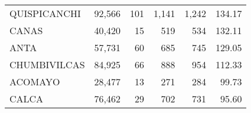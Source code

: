 \begin{tabular}{lrrrrr}
	\cellcolor[HTML]{FFFFC7}QUISPICANCHI                                              & 92,566                                                         & 101                                                      & 1,141                                                    & 1,242                                                               & 134.17                                                                       \\
	\cellcolor[HTML]{FFFFC7}CANAS                                                     & 40,420                                                         & 15                                                       & 519                                                      & 534                                                                 & 132.11                                                                       \\
	\cellcolor[HTML]{FFFFC7}ANTA                                                      & 57,731                                                         & 60                                                       & 685                                                      & 745                                                                 & 129.05                                                                       \\
	\cellcolor[HTML]{9AFF99}CHUMBIVILCAS                                              & 84,925                                                         & 66                                                       & 888                                                      & 954                                                                 & 112.33                                                                       \\
	\cellcolor[HTML]{9AFF99}ACOMAYO                                                   & 28,477                                                         & 13                                                       & 271                                                      & 284                                                                 & 99.73                                                                        \\
	\cellcolor[HTML]{9AFF99}CALCA                                                     & 76,462                                                         & 29                                                       & 702                                                      & 731                                                                 & 95.60                                                                        \\

\end{tabular}
